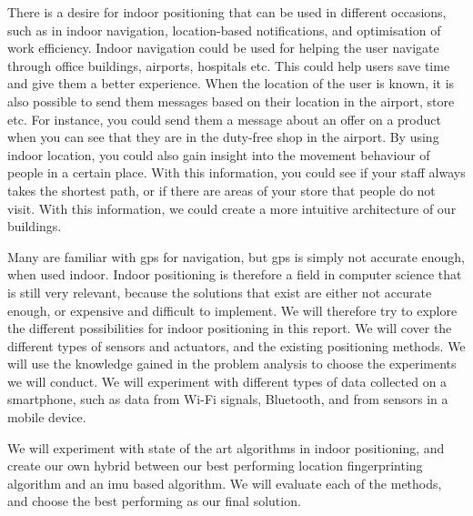 
There is a desire for indoor positioning that can be used in different occasions, such as in indoor navigation, location-based notifications, and optimisation of work efficiency. Indoor navigation could be used for helping the user navigate through office buildings, airports, hospitals etc. This could help users save time and give them a better experience. When the location of the user is known, it is also possible to send them messages based on their location in the airport, store etc. For instance, you could send them a message about an offer on a product when you can see that they are in the duty-free shop in the airport. By using indoor location, you could also gain insight into the movement behaviour of people in a certain place. With this information, you could see if your staff always takes the shortest path, or if there are areas of your store that people do not visit. With this information, we could create a more intuitive architecture of our buildings.\cite{IPSMapsPeople}

Many are familiar with \gls{gps} for navigation, but \gls{gps} is simply not accurate enough, when used indoor. Indoor positioning is therefore a field in computer science that is still very relevant, because the solutions that exist are either not accurate enough, or expensive and difficult to implement. We will therefore try to explore the different possibilities for indoor positioning in this report. We will cover the different types of sensors and actuators, and the existing positioning methods. We will use the knowledge gained in the problem analysis to choose the experiments we will conduct. We will experiment with different types of data collected on a smartphone, such as data from Wi-Fi signals, Bluetooth, and from sensors in a mobile device. 

We will experiment with state of the art algorithms in indoor positioning, and create our own hybrid between our best performing location fingerprinting algorithm and an \gls{imu} based algorithm. We will evaluate each of the methods, and choose the best performing as our final solution.